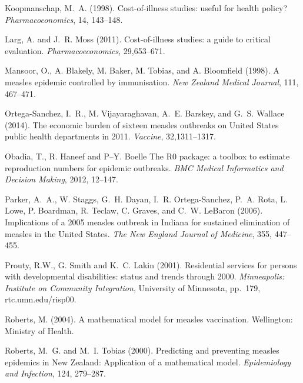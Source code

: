 \documentclass{article}
\begin{document}
\begin{thebibliography}{}
Koopmanschap, M.~A. (1998).
\newblock Cost-of-illness studies: useful for health policy?
\newblock \emph{Pharmacoeonomics}, 14, 143--148.

Larg, A. and J.~R. Moss (2011).
\newblock Cost-of-illness studies: a guide to critical evaluation.
\newblock \emph{Pharmacoeconomics}, 29,653--671.

Mansoor, O., A. Blakely, M. Baker, M. Tobias, and A. Bloomfield (1998).
\newblock A measles epidemic controlled by immunisation. 
\newblock \emph{New Zealand Medical Journal}, 111, 467--471.

Ortega-Sanchez, I.~R., M. Vijayaraghavan, A.~E. Barskey, and G.~S. Wallace (2014).
\newblock The economic burden of sixteen measles outbreaks on United States public health departments in 2011.
\newblock \emph{Vaccine}, 32,1311--1317.

Obadia, T., R. Haneef and P--Y. Boelle
\newblock The R0 package: a toolbox to estimate reproduction numbers for epidemic outbreaks.
\newblock \emph{BMC Medical Informatics and Decision Making}, 2012, 12--147.

Parker, A.~A., W. Staggs, G.~H. Dayan, I.~R. Ortega-Sanchez, P.~A. Rota, L. Lowe, P. Boardman, R. Teclaw, C. Graves, and C.~W. LeBaron (2006).
\newblock Implications of a 2005 measles outbreak in Indiana for sustained elimination of measles in the United States.
\newblock \emph{The New England Journal of Medicine}, 355, 447--455.

Prouty, R.W., G. Smith and K.~C. Lakin (2001).
\newblock Residential services for persons with developmental disabilities: status and trends through 2000.
\newblock \emph{Minneapolis: Institute on Community Integration}, University of Minnesota, pp.~179, rtc.umn.edu/risp00.

Roberts, M. (2004).
\newblock A mathematical model for measles vaccination.
\newblock Wellington: Ministry of Health.

Roberts, M.~G. and M.~I. Tobias (2000).
\newblock Predicting and preventing measles epidemics in New Zealand: Application of a mathematical model. 
\newblock \emph{Epidemiology and Infection}, 124, 279--287.


\end{thebibliography}
\end{document}

